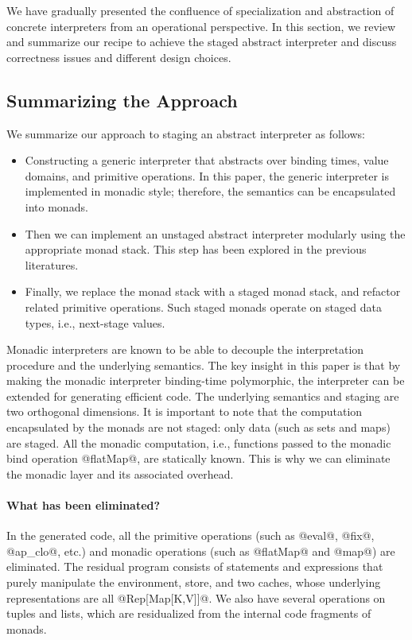 We have gradually presented the confluence of specialization and abstraction of
concrete interpreters from an operational perspective.  In this section, we
review and summarize our recipe to achieve the staged abstract interpreter and
discuss correctness issues and different design choices.

\subsection{Summarizing the Approach}

We summarize our approach to staging an abstract interpreter as follows:

\begin{itemize}
  \item Constructing a generic interpreter that abstracts over binding times,
    value domains, and primitive operations. In this paper, the generic interpreter
    is implemented in monadic style; therefore, the semantics can be encapsulated
    into monads.
  \item Then we can implement an unstaged abstract interpreter modularly using
    the appropriate monad stack. This step has been explored in the previous
    literatures.
  \item Finally, we replace the monad stack with a staged monad stack, and
    refactor related primitive operations.  Such staged monads operate on
    staged data types, i.e., next-stage values.
\end{itemize}

Monadic interpreters are known to be able to decouple the interpretation
procedure and the underlying semantics. The key insight in this paper is that
by making the monadic interpreter binding-time polymorphic, the interpreter can
be extended for generating efficient code. The underlying semantics and staging
are two orthogonal dimensions. It is important to note that the computation
encapsulated by the monads are not staged: only data (such as sets and maps)
are staged. All the monadic computation, i.e., functions passed to the monadic
bind operation @flatMap@, are statically known. This is why we can eliminate
the monadic layer and its associated overhead.

\paragraph{What has been eliminated?} In the generated code, all the
primitive operations (such as @eval@, @fix@, @ap_clo@, etc.) and monadic
operations (such as @flatMap@ and @map@) are eliminated. The residual program
consists of statements and expressions that purely manipulate the environment,
store, and two caches, whose underlying representations are all @Rep[Map[K,V]]@. We
also have several operations on tuples and lists, which are residualized from
the internal code fragments of monads. 

